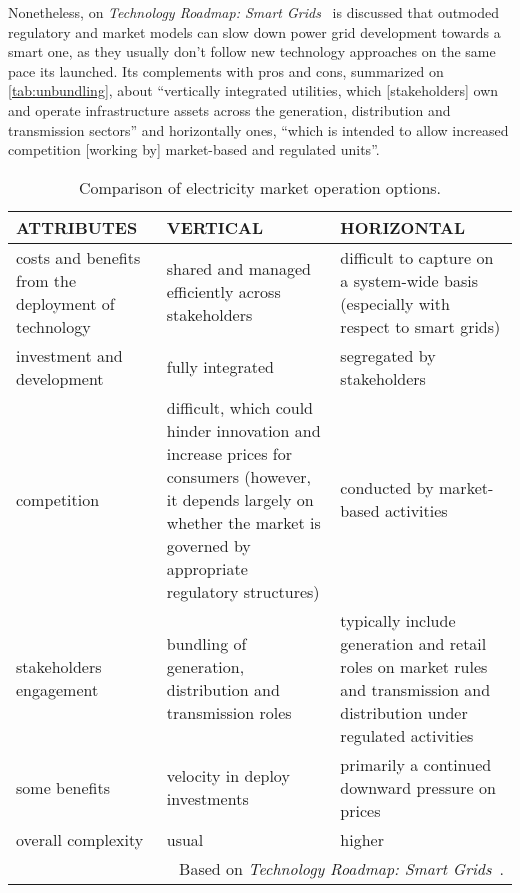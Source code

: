 \medskip %
Nonetheless, on \emph{Technology Roadmap: Smart Grids}~\cite{iea2011} is discussed that outmoded regulatory and market models can slow down power grid development towards a smart one, as they usually don't follow new technology approaches on the same pace its launched.
Its complements with pros and cons, summarized on \autoref{tab:unbundling}, about
``vertically integrated utilities, which [stakeholders] own and operate infrastructure assets across the generation, distribution and transmission sectors'' and
horizontally ones, ``which is intended to allow increased competition [working by] market-based and regulated units''.

\begin{table*}[!t]
  \renewcommand{\arraystretch}{1.3}
  \caption{Comparison of electricity market operation options.}
  \label{tab:unbundling}
  \centering
  \begin{tabular}{| m{} | m{}| m{} |}
    \hline
    ATTRIBUTES & VERTICAL & HORIZONTAL\\
    \hline
    costs and benefits from the deployment of technology & shared and managed efficiently across stakeholders & difficult to capture on a system-wide basis \newline (especially with respect to smart grids)\\
    investment and development & fully integrated & segregated by stakeholders\\
    competition & difficult, which could hinder innovation and increase prices for consumers \newline (however, it depends largely on whether the market is governed by appropriate regulatory structures) & conducted by market-based activities\\
    stakeholders engagement & bundling of generation, distribution and transmission roles & typically include generation and retail roles on market rules \newline and transmission and distribution under regulated activities\\
    some benefits & velocity in deploy investments & primarily a continued downward pressure on prices\\
    overall complexity & usual & higher\\
    \hline
    \multicolumn{3}{r}{\scriptsize{Based on \emph{Technology Roadmap: Smart Grids}~\cite{iea2011}}.}\\
  \end{tabular}
\end{table*}




